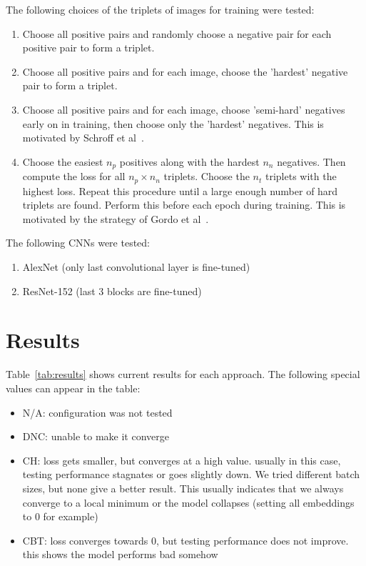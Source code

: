 \documentclass[fleqn]{article}
\begin{document}
The following choices of the triplets of images for training were tested:
\begin{enumerate}
    \item Choose all positive pairs and randomly choose a negative pair
    for each positive pair to form a triplet.
    \item Choose all positive pairs and for each image, choose the
    'hardest' negative pair to form a triplet.
    \item Choose all positive pairs and for each image, choose 'semi-hard'
    negatives early on in training, then choose only the 'hardest'
    negatives. This is motivated by Schroff et al~\cite{schroff_facenet:_2015}.
    \item Choose the easiest $n_p$ positives along with the
    hardest $n_n$ negatives. Then compute the loss for all $n_p\times n_n$
    triplets. Choose the $n_t$ triplets with the highest loss.
    Repeat this procedure until a large enough number of hard triplets
    are found. Perform this before each epoch during training.
    This is motivated by the strategy of Gordo et al~\cite{gordo_deep_2016}.
\end{enumerate}

The following CNNs were tested:
\begin{enumerate}
    \item AlexNet (only last convolutional layer is fine-tuned)
    \item ResNet-152 (last 3 blocks are fine-tuned)
\end{enumerate}

\section{Results}
Table~\ref{tab:results} shows current results for each approach.
The following special values can appear in the table:
\begin{itemize}
    \item N/A: configuration was not tested
    \item DNC: unable to make it converge
    \item CH: loss gets smaller, but converges at a high value.
    usually in this case, testing performance stagnates or goes slightly down.
    We tried different batch sizes, but none give a better result.
    This usually indicates that we always converge to a local minimum
    or the model collapses (setting all embeddings to 0 for example)
    \item CBT: loss converges towards 0, but testing performance does
    not improve. this shows the model performs bad somehow
\end{itemize}
\end{document}
